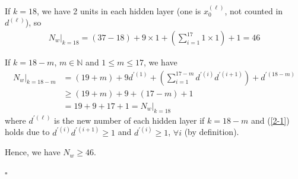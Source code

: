 \documentclass[12pt]{article}
\newcommand*{\QEDB}{\hfill\ensuremath{\square}}
\newcommand{\ParTh}[1]{\left(#1\right)}
\begin{document}
If $k=18$, we have 2 units in each hidden layer (one is $x^{\ParTh{\ell}}_0$, not counted in $d^{\ParTh{\ell}}$), so
\begin{align}
\left.N_w\right|_{k=18}=\ParTh{37-18}+9\times1+\ParTh{\sum_{i=1}^{17}1\times1}+1=46
\end{align}

If $k=18-m$, $m\in\mathbb{N}$ and $1\leq m\leq17$, we have
\begin{align}
\left.N_w\right|_{k=18-m}&=\ParTh{19+m}+9d^{\prime\ParTh{1}}+\ParTh{\sum_{i=1}^{17-m}d^{\prime\ParTh{i}}d^{\prime\ParTh{i+1}}}+d^{\prime\ParTh{18-m}}\\
\label{2-1}
&\geq\ParTh{19+m}+9+\ParTh{17-m}+1\\
&=19+9+17+1=\left.N_w\right|_{k=18}
\end{align}
where $d^{\prime\ParTh{\ell}}$ is the new number of each hidden layer if $k=18-m$ and (\ref{2-1}) holds due to $d^{\prime\ParTh{i}}d^{\prime\ParTh{i+1}}\geq1$ and $d^{\prime\ParTh{i}}\geq1$, $\forall i$ (by definition).

Hence, we have $N_w\geq46$.

\QEDB
\end{document}

